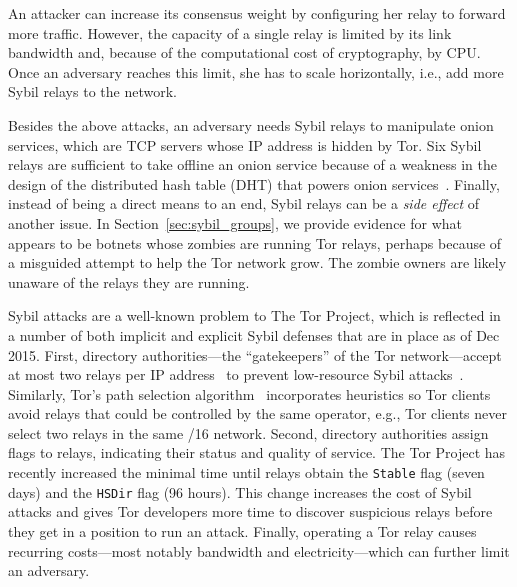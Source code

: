 An attacker can increase its consensus weight by configuring her relay to
forward more traffic.  However, the capacity of a single relay is limited by its
link bandwidth and, because of the computational cost of cryptography, by CPU.
Once an adversary reaches this limit, she has to scale horizontally, i.e., add
more Sybil relays to the network.

Besides the above attacks, an adversary needs Sybil relays to manipulate onion
services, which are TCP servers whose IP address is hidden by Tor.  Six Sybil
relays are sufficient to take offline an onion service because of a weakness in
the design of the distributed hash table (DHT) that powers onion
services~\cite{Biryukov2013a}.  Finally, instead of being a direct means to an
end, Sybil relays can be a \emph{side effect} of another issue.  In
Section~\ref{sec:sybil_groups}, we provide evidence for what appears to be
botnets whose zombies are running Tor relays, perhaps because of a misguided
attempt to help the Tor network grow.  The zombie owners are likely unaware of
the relays they are running.

Sybil attacks are a well-known problem to The Tor Project, which is reflected in
a number of both implicit and explicit Sybil defenses that are in place as of
Dec 2015.  First, directory authorities---the ``gatekeepers'' of the Tor
network---accept at most two relays per IP address~\cite{Bauer2007b} to prevent
low-resource Sybil attacks~\cite{Bauer2007a}.  Similarly, Tor's path selection
algorithm~\cite{path-spec} incorporates heuristics so Tor clients avoid relays
that could be controlled by the same operator, e.g., Tor clients never select
two relays in the same /16 network.  Second, directory authorities assign flags
to relays, indicating their status and quality of service.  The Tor Project has
recently increased the minimal time until relays obtain the \texttt{Stable} flag
(seven days) and the \texttt{HSDir} flag (96 hours).  This change increases the
cost of Sybil attacks and gives Tor developers more time to discover suspicious
relays before they get in a position to run an attack.  Finally, operating a Tor
relay causes recurring costs---most notably bandwidth and electricity---which
can further limit an adversary.

